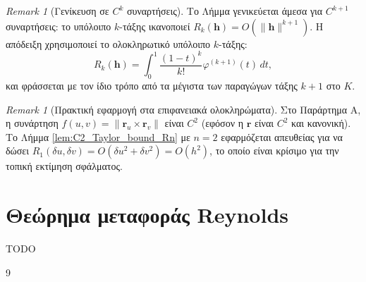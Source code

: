 \documentclass[10pt,a4paper,twoside,openany]{book}
\theoremstyle{plain}
\theoremstyle{definition}
\theoremstyle{remark}
\newtheorem{remark}[theorem]{Remark}
\numberwithin{equation}{section}
\begin{document}
\begin{remark}[Γενίκευση σε \(C^k\) συναρτήσεις]
Το Λήμμα γενικεύεται άμεσα για \(C^{k+1}\) συναρτήσεις: το υπόλοιπο \(k\)-τάξης ικανοποιεί \(R_k(\mathbf{h}) = O(\|\mathbf{h}\|^{k+1})\). Η απόδειξη χρησιμοποιεί το ολοκληρωτικό υπόλοιπο \(k\)-τάξης:
\[
R_k(\mathbf{h}) = \int_0^1 \frac{(1-t)^k}{k!} \varphi^{(k+1)}(t) \, dt,
\]
και φράσσεται με τον ίδιο τρόπο από τα μέγιστα των παραγώγων τάξης \(k+1\) στο \(K\).
\end{remark}

\begin{remark}[Πρακτική εφαρμογή στα επιφανειακά ολοκληρώματα]
Στο Παράρτημα Α, η συνάρτηση \(f(u,v) = \|\mathbf{r}_u \times \mathbf{r}_v\|\) είναι \(C^2\) (εφόσον η \(\mathbf{r}\) είναι \(C^2\) και κανονική). Το Λήμμα \ref{lem:C2_Taylor_bound_Rn} με \(n=2\) εφαρμόζεται απευθείας για να δώσει \(R_1(\delta u, \delta v) = O(\delta u^2 + \delta v^2) = O(h^2)\), το οποίο είναι κρίσιμο για την τοπική εκτίμηση σφάλματος.
\end{remark}


\section{Θεώρημα μεταφοράς Reynolds}

TODO

\backmatter

\begin{thebibliography}{9}
\end{thebibliography}
\end{document}
